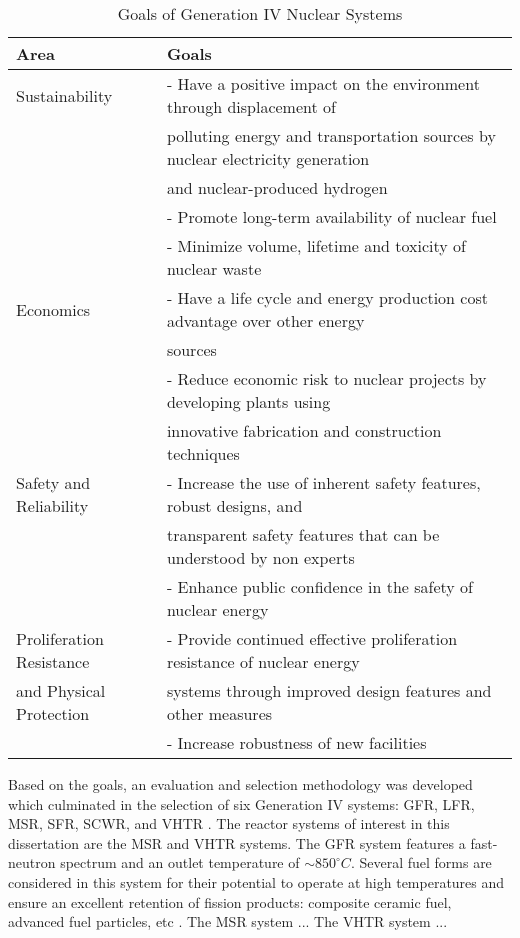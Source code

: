 \begin{table}[]
    \centering
    \onehalfspacing
    \caption{Goals of Generation IV Nuclear Systems \cite{gif_technology_2002,
    behar_technology_2014}}
	\label{tab:goals-gen4}
    \small
    \begin{tabular}{l|l}
    \hline
                               \textbf{Area} & \textbf{Goals} \\ \hline
    Sustainability   & - Have a positive impact on the environment through displacement of \\
    & polluting energy and transportation sources by nuclear electricity generation \\
    & and nuclear-produced hydrogen \\ 
    & - Promote long-term availability of nuclear fuel \\
    & - Minimize volume, lifetime and toxicity of nuclear waste \\ \hline
    Economics & - Have a life cycle and energy production cost advantage over other energy \\
    & sources \\ 
    & - Reduce economic risk to nuclear projects by developing plants using \\
    & innovative fabrication and construction techniques \\ \hline
    Safety and Reliability   & - Increase the use of inherent safety features, robust designs, and \\
    & transparent safety features that can be understood by non experts \\ 
    & - Enhance public confidence in the safety of nuclear energy \\\hline
    Proliferation Resistance & - Provide continued effective proliferation resistance of nuclear energy \\
    and Physical Protection & systems through improved design features and other measures \\ 
    & - Increase robustness of new facilities \\ \hline
    \end{tabular}
    \end{table}

Based on the goals, an evaluation and selection methodology was developed which 
culminated in the selection of six Generation IV systems: \gls{GFR}, 
\gls{LFR}, \gls{MSR}, \gls{SFR}, \gls{SCWR}, and \gls{VHTR} \cite{gif_technology_2002}. 
The reactor systems of interest in this dissertation are the \gls{MSR} and \gls{VHTR} systems. 
The \gls{GFR} system features a fast-neutron spectrum and an outlet temperature of 
$\sim 850 ^{\circ}C$. 
Several fuel forms are considered in this system for their potential to operate 
at high temperatures and ensure an excellent retention of fission products:
composite ceramic fuel, advanced fuel particles, etc \cite{gif_technology_2002}.   
The \gls{MSR} system ... 
The \gls{VHTR} system ... 

